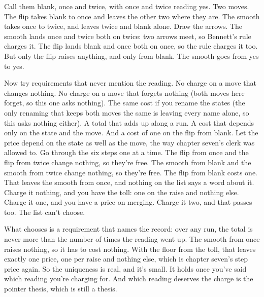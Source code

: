 \documentclass[11pt,twoside]{article}
\theoremstyle{thielethm}
\theoremstyle{thieledef}
\theoremstyle{thieledef}
\theoremstyle{thieledef}
\theoremstyle{thielethm}
\theoremstyle{thieleobs}
\theoremstyle{thielethm}
\begin{document}
Call them blank, once and twice, with once and twice reading yes. Two moves. The flip takes blank to once and leaves the other two where they are. The smooth takes once to twice, and leaves twice and blank alone. Draw the arrows. The smooth lands once and twice both on twice: two arrows meet, so Bennett's rule charges it. The flip lands blank and once both on once, so the rule charges it too. But only the flip raises anything, and only from blank. The smooth goes from yes to yes.

Now try requirements that never mention the reading. No charge on a move that changes nothing. No charge on a move that forgets nothing (both moves here forget, so this one asks nothing). The same cost if you rename the states (the only renaming that keeps both moves the same is leaving every name alone, so this asks nothing either). A total that adds up along a run. A cost that depends only on the state and the move. And a cost of one on the flip from blank. Let the price depend on the state as well as the move, the way chapter seven's clerk was allowed to. Go through the six steps one at a time. The flip from once and the flip from twice change nothing, so they're free. The smooth from blank and the smooth from twice change nothing, so they're free. The flip from blank costs one. That leaves the smooth from once, and nothing on the list says a word about it. Charge it nothing, and you have the toll: one on the raise and nothing else. Charge it one, and you have a price on merging. Charge it two, and that passes too. The list can't choose.

What chooses is a requirement that names the record: over any run, the total is never more than the number of times the reading went up. The smooth from once raises nothing, so it has to cost nothing. With the floor from the toll, that leaves exactly one price, one per raise and nothing else, which is chapter seven's step price again. So the uniqueness is real, and it's small. It holds once you've said which reading you're charging for. And which reading deserves the charge is the pointer thesis, which is still a thesis.
\end{document}
